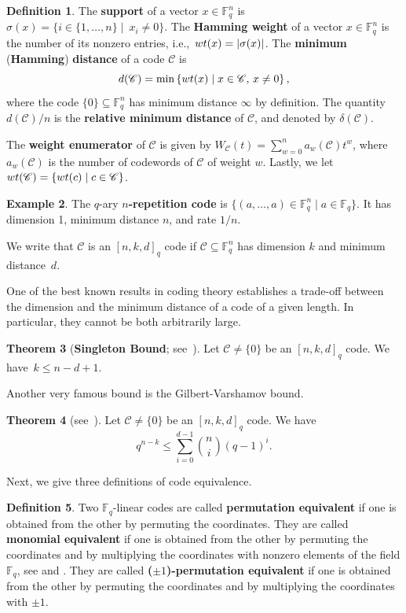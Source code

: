 \documentclass[11pt,a4paper]{article}
\newcommand{\wt}{\textnormal{wt}}
\theoremstyle{definition}
\newtheorem{theorem}{Theorem}[section]
\newtheorem{definition}[theorem]{Definition}
\newtheorem{example}[theorem]{Example}
\newcommand{\numberset}{\mathbb}
\newcommand{\F}{\numberset{F}}
\newcommand{\mC}{\mathcal{C}}
\begin{document}
\begin{definition}
\label{def:weight_distance}
The \textbf{support} of a vector $x \in \F_q^n$ is
$\sigma(x) = \{i \in \{1,\ldots,n\} \mid \ x_i \neq 0\}$. The \textbf{Hamming weight} of a vector $x \in \F_q^n$ is the number of its nonzero entries, i.e.,~$\wt(x)=|\sigma(x)|$. 
The \textbf{minimum} (\textbf{Hamming}) \textbf{distance} of a code $\mC $
is 
$$d(\mC)=\min\left\{\wt(x) \mid x \in \mC, \, x \neq 0\right\},$$
where the code $\{0\} \subseteq \F_q^n$ has minimum distance $\infty$ by definition. The quantity $d(\mC)/n$ is the \textbf{relative minimum distance} of $\mC$, and denoted by $\delta(\mC)$.


The \textbf{weight enumerator} of $\mC $ is given by  
$W_{\mC}(t)=\sum_{w=0}^n a_w(\mC)t^w$, where $a_w(\mC)$ is the number of codewords of $\mC$ of weight $w$. 
Lastly, we let $\wt(\mC) = \{\wt(c) \mid c \in \mC \}$. 

\end{definition}

\begin{example}
\label{ex:repetition}
The $q$-ary \textbf{$n$-repetition code} is $\{(a,\ldots,a) \in \F_q^n \mid a \in \F_q\}$. It has dimension 1, minimum distance $n$, and rate $1/n$.


\end{example}


We write that $\mC$ is an $[n,k,d]_q$ code
if $\mC \subseteq \F_q^n$ has dimension $k$ and minimum distance~$d$. 

One of the best known results in coding theory establishes a trade-off between the dimension and the minimum distance of a code of a given length. In particular, they cannot be both arbitrarily large.

\begin{theorem}[\textbf{Singleton Bound}; see~\cite{singleton1964maximum}] \label{thm:sbound}
Let $\mC \neq \{0\}$ be an $[n,k,d]_q$ code. We have~$k \le n-d+1$.
\end{theorem}
Another very famous bound is the Gilbert-Varshamov bound.
\begin{theorem}[see~\cite{gilbert1952comparison,varshamov1957estimate}] \label{thm:gvbound}
Let $\mC \neq \{0\}$ be an $[n,k,d]_q$ code. We have 
$$q^{n-k} \le \sum_{i=0}^{d-1} \binom{n}{i}(q-1)^i.$$
\end{theorem}


Next, we give three definitions of code equivalence.
\begin{definition}
\label{d-mono-perm-pm-equiv}
Two $\F_q$-linear codes are called \textbf{permutation equivalent} if one is obtained from the other by permuting the coordinates.
They are called \textbf{monomial equivalent} if one is obtained from the other by permuting the coordinates and by multiplying the coordinates 
with nonzero elements of the field $\F_q$, see \cite{huffman2010fundamentals} and \cite[Definition 1.1.15]{pellikaan2018}.
They are called \textbf{($\pm1$)-permutation equivalent} if one is obtained from the other by permuting the coordinates and by multiplying the coordinates with $\pm 1$.
\end{definition}
\end{document}
